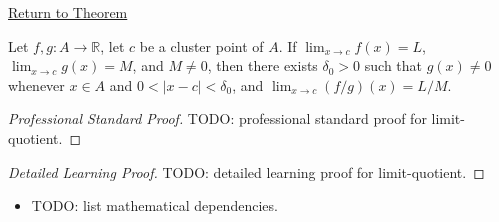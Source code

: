 \newpage
{}
\label{prf:limit-quotient}

\begin{remark*}[Return]
\hyperref[thm:limit-quotient]{Return to Theorem}
\end{remark*}

\begin{theorem*}
Let $f, g : A \to \mathbb{R}$, let $c$ be a cluster point of $A$. If
$\lim_{x\to c}f(x)=L$, $\lim_{x\to c}g(x)=M$, and $M \neq 0$, then there
exists $\delta_0 > 0$ such that $g(x) \neq 0$ whenever $x \in A$ and
$0 < |x-c| < \delta_0$, and $\lim_{x\to c}(f/g)(x) = L/M$.
\end{theorem*}

\begin{proof}[Professional Standard Proof]
\LRAProofBodyStart
TODO: professional standard proof for limit-quotient.
\end{proof}

\begin{proof}[Detailed Learning Proof]
\LRAProofBodyStart
TODO: detailed learning proof for limit-quotient.
\end{proof}

\begin{remark*}
\end{remark*}

\begin{dependencies}
\begin{itemize}
  \item TODO: list mathematical dependencies.
\end{itemize}
\end{dependencies}

\clearpage
